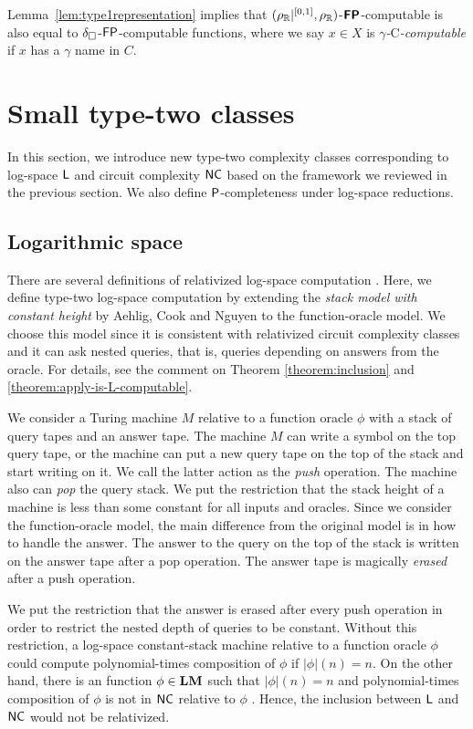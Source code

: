 \documentclass[envcountsame,orivec,oribibl]{llncs}
\begin{document}
Lemma~\ref{lem:type1representation} implies that
$(\rho _\mathbb R|^{[0,1]},\rho _\mathbb R)$-$\text{\bfseries \sffamily \upshape FP}$-computable is also equal to 
$\delta _\square$-$\mathsf{FP}$-computable functions,
where we say $x \in X$ is \emph{$\gamma$-$\mathrm C$-computable} if
$x$ has a $\gamma$ name in $C$.


\section{Small type-two classes}
\label{section:small-classes}

In this section, we introduce new type-two complexity classes
corresponding to log-space $\mathsf{L}$ and circuit complexity $\mathsf{NC}$
based on the framework we reviewed in the previous section.
We also define $\mathsf{P}$-completeness under log-space reductions.

\subsection{Logarithmic space}
There are several definitions of relativized log-space computation
\cite{aehlig2007relativizing,buss1988relativized,ladner1976relativization,wilson1988measure}.
Here, we define type-two log-space computation 
by extending the {\em stack model with constant height} 
by Aehlig, Cook and Nguyen \cite{aehlig2007relativizing} to the 
function-oracle model.
We choose this model since it is consistent with relativized circuit complexity classes 
and it can ask nested queries, that is, queries depending on answers from the oracle.
For details, see the comment on Theorem \ref{theorem:inclusion} and \ref{theorem:apply-is-L-computable}.


We consider a Turing machine $M$ relative to a function oracle $\phi$
with a stack of query tapes and an answer tape.
The machine $M$ can write a symbol on the top query tape, or the machine can
put a new query tape on the top of the stack and start writing on it.
We call the latter action as the {\em push} operation.
The machine also can {\em pop} the query stack.
We put the restriction that the stack height of a machine is less than 
some constant for all inputs and oracles.
Since we consider the function-oracle model, the main difference from
the original model is in how to handle the answer.
The answer to the query on the top of the stack is written on the answer tape after a pop operation.
The answer tape is magically {\em erased} after a push operation.

We put the restriction that the answer is erased after every push operation 
in order to restrict the nested depth of queries to be constant.
Without this restriction, a log-space constant-stack machine relative to 
a function oracle $\phi$ could compute polynomial-times composition
of $\phi$ if $|\phi|(n) = n$.
On the other hand, there is an function $\phi \in \mathbf{LM}$ such that $|\phi|(n) = n$
and polynomial-times composition of $\phi$ is not in $\mathsf{NC}$ relative to $\phi$ \cite{aehlig2007relativizing}.
Hence, the inclusion between $\mathsf{L}$ and $\mathsf{NC}$ would not be relativized.
\end{document}
